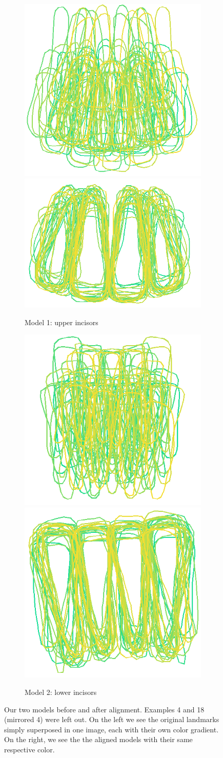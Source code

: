 \documentclass[a4paper,titlepage,12pt]{article}
\begin{document}
\begin{figure}
	\centering
	\begin{subfigure}{\linewidth}
		\centering
		\includegraphics[width=0.4\linewidth]{shape/upper_init}
		\includegraphics[width=0.4\linewidth]{shape/upper_aligned}
		\caption{Model 1: upper incisors}
	\end{subfigure}
	\begin{subfigure}{\linewidth}
		\centering
		\includegraphics[width=0.4\linewidth]{shape/lower_init}
		\includegraphics[width=0.4\linewidth]{shape/lower_aligned}
		\caption{Model 2: lower incisors}
	\end{subfigure}
	\caption{Our two models before and after alignment. Examples 4 and 18 (mirrored 4) were left out. On the left we see the original landmarks simply superposed in one image, each with their own color gradient. On the right, we see the the aligned models with their same respective color. }
	\label{fig:align}
\end{figure}
\end{document}
